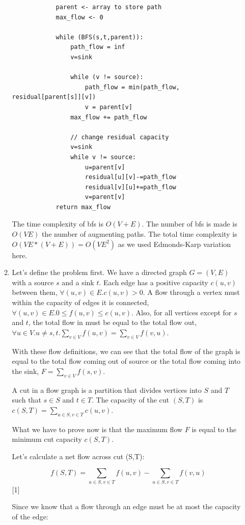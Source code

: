 \documentclass{article}
\begin{document}
\begin{enumerate}
\begin{enumerate}
\begin{lstlisting}
            parent <- array to store path
            max_flow <- 0
    
            while (BFS(s,t,parent)):
                path_flow = inf
                v=sink
    
                while (v != source):
                    path_flow = min(path_flow, residual[parent[s]][v])
                    v = parent[v]
                max_flow += path_flow
    
                // change residual capacity
                v=sink
                while v != source:
                    u=parent[v]
                    residual[u][v]-=path_flow
                    residual[v][u]+=path_flow
                    v=parent[v]
            return max_flow
        \end{lstlisting}
    
        The time complexity of bfs is $O(V+E)$.
        The number of bfs is made is $O(VE)$ the number of augmenting paths.
        The total time complexity is $O(VE*(V+E))=O(VE^2)$ as we used Edmonds-Karp variation here.

        \item Let's define the problem first.
        We have a directed graph $G=(V,E)$ with a source $s$ and a sink $t$.
        Each edge has a positive capacity $c(u,v)$ between them, $\forall (u,v)\in E.c(u,v)>0$.
        A flow through a vertex must within the capacity of edges it is connected, $\forall (u,v)\in E.0\leq f(u,v) \leq c(u,v)$.
        Also, for all vertices except for $s$ and $t$, the total flow in must be equal to the total flow out,
        $\forall u\in V.u\neq s,t.\sum_{v\in V}f(u,v)=\sum_{v\in V}f(v,u)$.

        With these flow definitions, we can see that the total flow of the graph is equal to the total flow coming out of source or the total flow coming into the sink,
        $F=\sum_{v\in V}f(s,v)$.

        A cut in a flow graph is a partition that divides vertices into $S$ and $T$ such that $s\in S$ and $t\in T$.
        The capacity of the cut $(S,T)$ is $c(S,T)=\sum_{u\in S,v\in T}c(u,v)$.

        What we have to prove now is that the maximum flow $F$ is equal to the minimum cut capacity $c(S,T)$.

        Let's calculate a net flow across cut (S,T):

        \[f(S,T)=\sum_{u\in S,v\in T}f(u,v)-\sum_{u\in S,v\in T}f(v,u)\] [1]

        Since we know that a flow through an edge must be at most the capacity of the edge:


\end{enumerate}
\end{enumerate}
\end{document}
